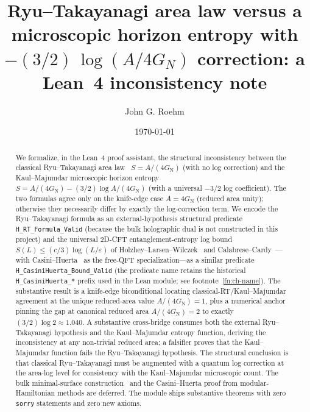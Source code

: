 \documentclass[twocolumn]{revtex4-2}
\newcommand{\GN}{G_{\mathrm{N}}}
\newcommand{\redArea}{A/(4\GN)}
\begin{document}
\title{Ryu--Takayanagi area law versus a microscopic horizon entropy
with $-(3/2)\,\log(A/4 G_N)$ correction: a Lean~4 inconsistency note}

\author{John G. Roehm}

\date{\today}

\begin{abstract}
We formalize, in the Lean~4 proof assistant, the structural
inconsistency between the classical Ryu--Takayanagi area
law~\cite{RyuTakayanagi2006} $S = A / (4 \GN)$ (with no log
correction) and the Kaul--Majumdar microscopic horizon
entropy~\cite{KaulMajumdar2000} $S = A/(4\GN) - (3/2)\log\!\redArea$
(with a universal $-3/2$ log coefficient). The two formulas agree
only on the knife-edge case $A = 4\GN$ (reduced area unity); otherwise
they necessarily differ by exactly the log-correction term. We encode
the Ryu--Takayanagi formula as an external-hypothesis structural
predicate \texttt{H\_RT\_Formula\_Valid} (because the bulk holographic
dual is not constructed in this project) and the universal 2D-CFT
entanglement-entropy log bound $S(L) \le (c/3) \log(L/\varepsilon)$
of Holzhey--Larsen--Wilczek~\cite{HolzheyLarsenWilczek1994} and
Calabrese--Cardy~\cite{CalabreseCardy2004}---with
Casini--Huerta~\cite{CasiniHuerta2009} as the free-QFT
specialization---as a similar predicate
\texttt{H\_CasiniHuerta\_Bound\_Valid} (the predicate name retains
the historical \texttt{H\_CasiniHuerta\_*} prefix used in the Lean
module; see footnote~\ref{fn:ch-name}). The
substantive result is a knife-edge biconditional locating
classical-RT/Kaul--Majumdar agreement at the unique reduced-area
value $A/(4\GN) = 1$, plus a numerical anchor pinning the gap at
canonical reduced area $A/(4\GN) = 2$ to exactly
$(3/2)\log 2 \approx 1.040$. A substantive cross-bridge consumes
both the external Ryu--Takayanagi hypothesis and the Kaul--Majumdar
entropy function, deriving the inconsistency at any non-trivial
reduced area; a falsifier proves that the Kaul--Majumdar function
fails the Ryu--Takayanagi hypothesis. The structural conclusion is
that classical Ryu--Takayanagi must be augmented with a quantum
log correction at the area-log level for consistency with the
Kaul--Majumdar microscopic count. The bulk minimal-surface
construction~\cite{LewkowyczMaldacena2013} and the
Casini--Huerta proof from modular-Hamiltonian methods are deferred.
The module ships \rtChThms{} substantive theorems with zero \texttt{sorry}
statements and zero new axioms.
\end{abstract}
\end{document}
